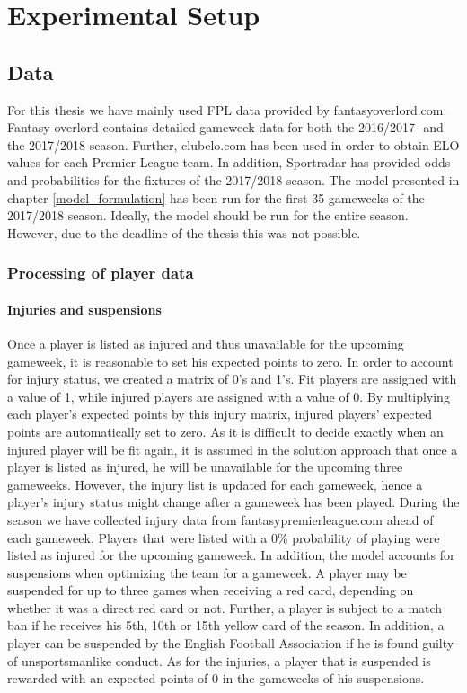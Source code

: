 \chapter{Experimental Setup}



\section{Data}
For this thesis we have mainly used FPL data provided by fantasyoverlord.com. Fantasy overlord contains detailed gameweek data for both the 2016/2017- and the 2017/2018 season. Further, clubelo.com has been used in order to obtain ELO values for each Premier League team. In addition, Sportradar has provided odds and probabilities for the fixtures of the 2017/2018 season. 
\newpar
The model presented in chapter \ref{model_formulation} has been run for the first 35 gameweeks of the 2017/2018 season. Ideally, the model should be run for the entire season. However, due to the deadline of the thesis this was not possible. 

\subsection{Processing of player data}
\subsubsection{Injuries and suspensions}
Once a player is listed as injured and thus unavailable for the upcoming gameweek, it is reasonable to set his expected points to zero. In order to account for injury status, we created a matrix of 0's and 1's. Fit players are assigned with a value of 1, while injured players are assigned with a value of 0. By multiplying each player's expected points by this injury matrix, injured players' expected points are automatically set to zero. As it is difficult to decide exactly when an injured player will be fit again, it is assumed in the solution approach that once a player is listed as injured, he will be unavailable for the upcoming three gameweeks. However, the injury list is updated for each gameweek, hence a player's injury status might change after a gameweek has been played. During the season we have collected injury data from fantasypremierleague.com ahead of each gameweek. Players that were listed with a 0\% probability of playing were listed as injured for the upcoming gameweek. 
\newpar
In addition, the model accounts for suspensions when optimizing the team for a gameweek. A player may be suspended for up to three games when receiving a red card, depending on whether it was a direct red card or not. Further, a player is subject to a match ban if he receives his 5th, 10th or 15th yellow card of the season. In addition, a player can be suspended by the English Football Association if he is found guilty of unsportsmanlike conduct. As for the injuries, a player that is suspended is rewarded with an expected points of 0 in the gameweeks of his suspensions. 

